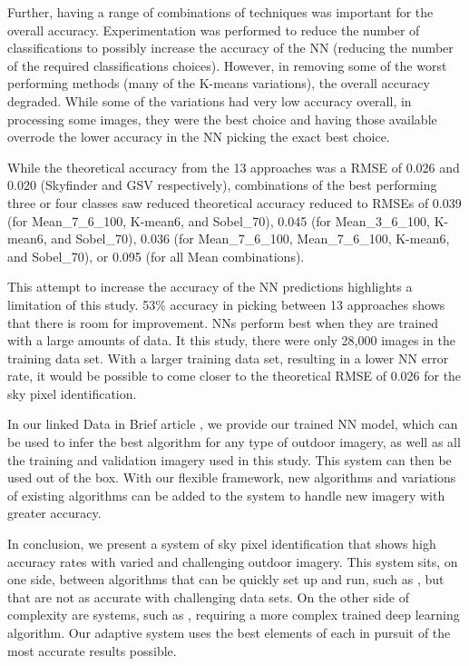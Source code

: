 \documentclass[final,3p,times,authoryear]{elsarticle}
\begin{document}
Further, having a range of combinations of techniques was important for the overall accuracy. Experimentation was performed to reduce the number of classifications to possibly increase the accuracy of the NN (reducing the number of the required classifications choices). However, in removing some of the worst performing methods (many of the K-means variations), the overall accuracy degraded. While some of the variations had very low accuracy overall, in processing some images, they were the best choice and having those available overrode the lower accuracy in the NN picking the exact best choice.

While the theoretical accuracy from the 13 approaches was a RMSE of 0.026 and 0.020 (Skyfinder and GSV respectively), combinations of the best performing three or four classes saw reduced theoretical accuracy reduced to RMSEs of 0.039 (for Mean\_7\_6\_100, K-mean6, and Sobel\_70), 0.045 (for Mean\_3\_6\_100, K-mean6, and Sobel\_70), 0.036 (for Mean\_7\_6\_100, Mean\_7\_6\_100, K-mean6, and Sobel\_70), or 0.095 (for all Mean combinations). 

This attempt to increase the accuracy of the NN predictions highlights a limitation of this study. 53\% accuracy in picking between 13 approaches shows that there is room for improvement. NNs perform best when they are trained with a large amounts of data. It this study, there were only 28,000 images in the training data set. With a larger training data set, resulting in a lower NN error rate, it would be possible to come closer to the theoretical RMSE of 0.026 for the sky pixel identification.

In our linked Data in Brief article \citep{Nice2019Data}, we provide our trained NN model, which can be used to infer the best algorithm for any type of outdoor imagery, as well as all the training and validation imagery used in this study. This system can then be used out of the box. With our flexible framework, new algorithms and variations of existing algorithms can be added to the system to handle new imagery with greater accuracy. 

In conclusion, we present a system of sky pixel identification that shows high accuracy rates with varied and challenging outdoor imagery. This system sits, on one side, between algorithms that can be quickly set up and run, such as \cite{Middel2018}, but that are not as accurate with challenging data sets. On the other side of complexity are systems, such as \cite{Gong2018}, requiring a more complex trained deep learning algorithm. Our adaptive system uses the best elements of each in pursuit of the most accurate results possible.
\end{document}

